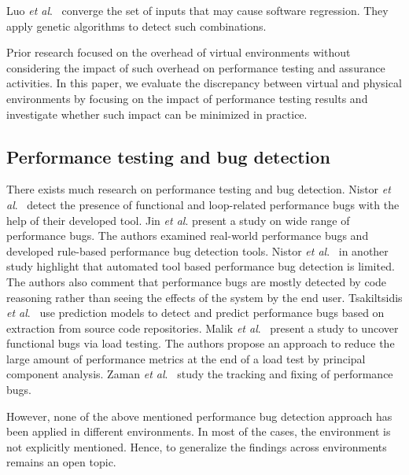 
Luo \textit{et al$.$}~\cite{Luo:2016:MPR:2901739.2901765} converge the set of inputs that may cause software regression. They apply genetic algorithms to detect such combinations. 

Prior research focused on the overhead of virtual environments without considering the impact of such overhead on performance testing and assurance activities. In this paper, we evaluate the discrepancy between virtual and physical environments by focusing on the impact of performance testing results and investigate whether such impact can be minimized in practice.



\subsection{Performance testing and bug detection}

There exists much research on performance testing and bug detection. Nistor \textit{et al$.$}~\cite{Nistor} detect the presence of functional and loop-related performance bugs with the help of their developed tool. Jin \textit{et al$.$} \cite{Jin} present a study on wide range of performance bugs. The authors examined real-world performance bugs and developed rule-based performance bug detection tools. Nistor \textit{et al$.$}~\cite{nistor_2} in another study highlight that automated tool based performance bug detection is limited. The authors also comment that performance bugs are mostly detected by code reasoning rather than seeing the effects of the system by the end user. Tsakiltsidis \textit{et al$.$}~\cite{Tsakiltsidis} use prediction models to detect and predict performance bugs based on extraction from source code repositories. Malik \textit{et al$.$}~\cite{h_malik_p_bugs} present a study to uncover functional bugs via load testing. The authors propose an approach to reduce the large amount of performance metrics at the end of a load test by principal component analysis. Zaman \textit{et al$.$}~\cite{zaman_p_bugs} study the tracking and fixing of performance bugs.

However, none of the above mentioned performance bug detection approach has been applied in different environments. In most of the cases, the environment is not explicitly mentioned. Hence, to generalize the findings across environments remains an open topic.